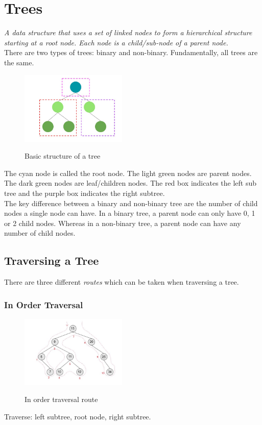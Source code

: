 \documentclass[a4paper,11pt, twocolumn]{article}
\begin{document}
\section{Trees}
\textit{A data structure that uses a set of linked nodes to form a hierarchical structure starting at a root node. Each node is a child/sub-node of a parent node.}\\
There are two types of trees: binary and non-binary. Fundamentally, all trees are the same.
\begin{figure}[H]
    \centering
    \includegraphics[width=0.45\textwidth]{treeIntro.jpg}
    \label{fig:treeIntro}
    \caption{Basic structure of a tree}
\end{figure}
\noindent The cyan node is called the root node. The light green nodes are parent nodes. The dark green nodes are leaf/children nodes. The red box indicates the left sub tree and the purple box indicates the right subtree.\\
The key difference between a binary and non-binary tree are the number of child nodes a single node can have. In a binary tree, a parent node can only have 0, 1 or 2 child nodes. Whereas in a non-binary tree, a parent node can have any number of child nodes.
\subsection{Traversing a Tree}
There are three different \textit{routes} which can be taken when traversing a tree.
\subsubsection{In Order Traversal}
\begin{figure}[H]
    \centering
    \includegraphics[width=0.45\textwidth]{treeInOrder.jpg}
    \label{fig:treeInOrder}
    \caption{In order traversal route}
\end{figure}
\noindent Traverse: left subtree, root node, right subtree.
\end{document}
